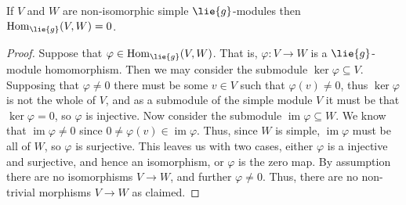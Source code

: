 \documentclass[fleqn]{NotesClass}
\DeclareMathOperator{\Hom}{Hom}
\DeclareMathOperator{\im}{im}
\begin{document}
    \begin{lma}{}{}
        If \(V\) and \(W\) are non-isomorphic simple \(\lie{g}\)-modules then \(\Hom_{\lie{g}}(V, W) = 0\).
        \begin{proof}
            Suppose that \(\varphi \in \Hom_{\lie{g}}(V, W)\).
            That is, \(\varphi \colon V \to W\) is a \(\lie{g}\)-module homomorphism.
            Then we may consider the submodule \(\ker \varphi \subseteq V\).
            Supposing that \(\varphi \ne 0\) there must be some \(v \in V\) such that \(\varphi(v) \ne 0\), thus \(\ker \varphi\) is not the whole of \(V\), and as a submodule of the simple module \(V\) it must be that \(\ker \varphi = 0\), so \(\varphi\) is injective.
            Now consider the submodule \(\im \varphi \subseteq W\).
            We know that \(\im \varphi \ne 0\) since \(0 \ne \varphi(v) \in \im \varphi\).
            Thus, since \(W\) is simple, \(\im \varphi\) must be all of \(W\), so \(\varphi\) is surjective.
            This leaves us with two cases, either \(\varphi\) is a injective and surjective, and hence an isomorphism, or \(\varphi\) is the zero map.
            By assumption there are no isomorphisms \(V \to W\), and further \(\varphi \ne 0\).
            Thus, there are no non-trivial morphisms \(V \to W\) as claimed.
        \end{proof}
    \end{lma}
    
\end{document}
